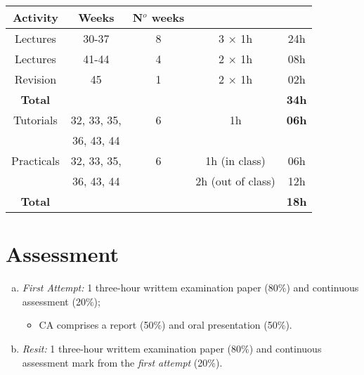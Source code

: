 \documentclass[11pt,oneside,a4paper]{article}
\begin{document}
\begin{center}
\begin{tabular}{||c c c c c ||}
\hline\hline
{\bf Activity} & {\bf Weeks}  & {\bf N$^{o}$ weeks} &                &       \\
\hline\hline
Lectures       &  30-37       &  8                 &  3 $\times$ 1h &  24h    \\
Lectures       &  41-44       &  4                 &  2 $\times$ 1h &  08h     \\
Revision       &   45         &  1                 &  2 $\times$ 1h &  02h     \\
{\bf Total}    &              &                    &                &  {\bf 34h}\\
\hline
Tutorials      & 32, 33, 35,  &  6                &  1h            &  {\bf 06h}  \\
               & 36, 43, 44   &                   &                &            \\
\hline
Practicals     & 32, 33, 35,  &  6                &  1h (in class) &   06h  \\
               & 36, 43, 44   &                   &  2h (out of class)& 12h  \\ 
{\bf Total}    &              &                   &                &  {\bf 18h}\\
\hline\hline
\end{tabular}
\end{center}

\section{Assessment}
\begin{enumerate}[(a)]
\item {\it First Attempt:} 1 three-hour writtem examination paper (80$\%$) and continuous assessment (20$\%$);
\begin{itemize}
\item CA comprises a report (50$\%$) and oral presentation (50$\%$). 
\end{itemize}
\item {\it Resit:} 1 three-hour writtem examination paper (80$\%$) and continuous assessment mark from the {\it first attempt} (20$\%$). 
\end{enumerate}
\end{document}
